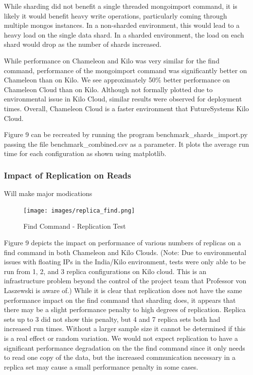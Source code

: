 \documentclass[9pt,twocolumn,twoside]{styles/osajnl}
\begin{document}
While sharding did not benefit a single threaded mongoimport command, it is likely it would benefit heavy write operations, particularly coming through multiple mongos instances.  In a non-sharded environment, this would lead to a heavy load on the single data shard.  In a sharded environment, the load on each shard would drop as the number of shards increased.

While performance on Chameleon and Kilo was very similar for the find command, performance of the mongoimport command was significantly better on Chameleon than on Kilo.  We see approximately 50\% better performance on Chameleon Cloud than on Kilo.  Although not formally plotted due to environmental issue in Kilo Cloud, similar results were observed for deployment times.  Overall, Chameleon Cloud is a faster environment that FutureSystems Kilo Cloud.

Figure 9 can be recreated by running the program benchmark\_shards\_import.py passing the file benchmark\_combined.csv as a parameter.  It plots the average run time for each configuration as shown using matplotlib.




\subsubsection{Impact of Replication on Reads}

Will make major modications

\begin{figure}[!ht]
  \texttt{[image: images/replica\_find.png]}
  \caption{Find Command - Replication Test}
\end{figure}


Figure 9 depicts the impact on performance of various numbers of replicas on a find command in both Chameleon and Kilo Clouds.  (Note: Due to environmental issues with floating IPs in the India/Kilo environment, tests were only able to be run from 1, 2, and 3 replica configurations on Kilo cloud.  This is an infrastructure problem beyond the control of the project team that Professor von Laszewski is aware of.)  While it is clear that replication does not have the same performance impact on the find command that sharding does, it appears that there may be a slight performance penalty to high degrees of replication.  Replica sets up to 3 did not show this penalty, but 4 and 7 replica sets both had increased run times.  Without a larger sample size it cannot be determined if this is a real effect or random variation.  We would not expect replication to have a significant performance degradation on the the find command since it only needs to read one copy of the data, but the increased communication necessary in a replica set may cause a small performance penalty in some cases.
\end{document}
